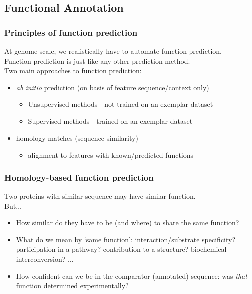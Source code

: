 
\subsection{Functional Annotation}

\begin{frame}
  \frametitle{Principles of function prediction}
  At genome scale, we realistically have to automate function prediction. \\
  Function prediction is just like any other prediction method. \\
  Two main approaches to function prediction:
  \begin{itemize}
    \item \textit{ab initio} prediction (on basis of feature sequence/context only)
    \begin{itemize}
      \item Unsupervised methods - not trained on an exemplar dataset
      \item Supervised methods - trained on an exemplar dataset
    \end{itemize}
    \item homology matches (sequence similarity)
    \begin{itemize}
      \item alignment to features with known/predicted functions
    \end{itemize}
  \end{itemize}
\end{frame}

\begin{frame}
  \frametitle{Homology-based function prediction}
  Two proteins with similar sequence may have similar function.\\
  But$\ldots$
  \begin{itemize}
    \item How similar do they have to be (and where) to share the same function?
    \item What do we mean by `same function': interaction/substrate specificity? participation in a pathway? contribution to a structure? biochemical interconversion? $\ldots$
    \item How confident can we be in the comparator (annotated) sequence: was \textit{that} function determined experimentally?
  \end{itemize}
\end{frame}

